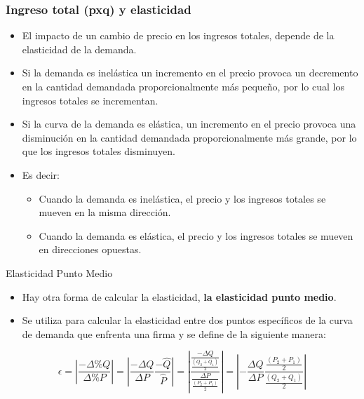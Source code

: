\documentclass{beamer}
\begin{document}
\begin{frame}
\frametitle{Ingreso total (pxq) y elasticidad}
\begin{itemize}
    \item El impacto de un cambio de precio en los ingresos totales, depende de la elasticidad de la demanda.
    \item Si la demanda es inelástica un incremento en el precio provoca un decremento en la cantidad demandada proporcionalmente más pequeño, por lo cual los ingresos totales se incrementan.
    \item Si la curva de la demanda es elástica, un incremento en el precio provoca una disminución en la cantidad demandada proporcionalmente más grande, por lo que los ingresos totales disminuyen.
    \item Es decir:
    \begin{itemize}
        \item Cuando la demanda es inelástica, el precio y los ingresos totales se mueven en la misma dirección.
        \item Cuando la demanda es elástica, el precio y los ingresos totales se mueven en direcciones opuestas.
    \end{itemize}
\end{itemize}
\end{frame}

\begin{frame}{Elasticidad Punto Medio}
  \begin{itemize}
      \item Hay otra forma de calcular la elasticidad, \textbf{la elasticidad punto medio}.
      \item Se utiliza para calcular la elasticidad entre dos puntos
      específicos de la curva de demanda que enfrenta una firma y se define
      de la siguiente manera:
    \end{itemize}
    \begin{equation*}
      \epsilon = \left|\frac{- \Delta \% Q}{\Delta \% P}\right|= \left|\frac{- \Delta Q}{\Delta P} \frac{- \hat Q}{\hat P}\right| = \left|\frac{\frac{- \Delta Q}{\frac{(Q_2+Q_1)}{2}}}{\frac{\Delta P}{\frac{(P_2+P_1)}{2}}}\right| = \left|-\frac{\Delta Q}{\Delta P} \frac{\frac{(P_2+P_1)}{2}}{\frac{(Q_2+Q_1)}{2}}\right|
    \end{equation*}
\end{frame}
\end{document}

